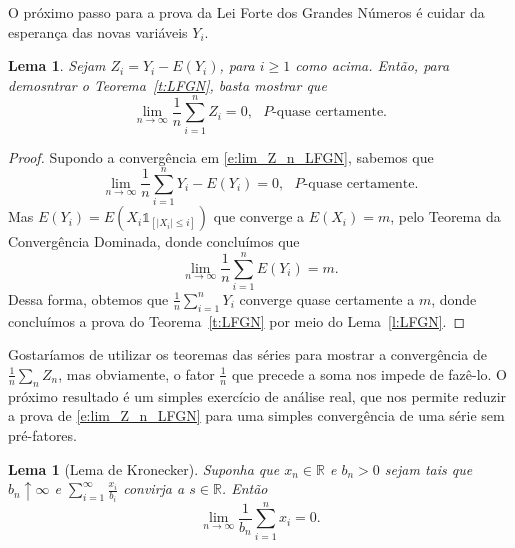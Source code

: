 \documentclass[reqno, draft]{book}
\newcommand*\1{\mathds{1}}
\newtheorem{lemma}[theorem]{Lema}
\begin{document}
O próximo passo para a prova da Lei Forte dos Grandes Números é cuidar da esperança das novas variáveis $Y_i$.
\begin{lemma}
  \label{l:lim_Z_n_LFGN}
  Sejam $Z_i = Y_i - E(Y_i)$, para $i \geq 1$ como acima.
  Então, para demosntrar o Teorema~\ref{t:LFGN}, basta mostrar que
  \begin{equation}
    \label{e:lim_Z_n_LFGN}
    \lim_{n \to \infty}\frac{1}{n} \sum_{i=1}^n Z_i = 0, \text{ $P$-quase certamente.}
  \end{equation}
\end{lemma}

\begin{proof}
  Supondo a convergência em \eqref{e:lim_Z_n_LFGN}, sabemos que
  \begin{equation}
    \lim_{n \to \infty} \frac{1}{n} \sum_{i=1}^n Y_i - E(Y_i) = 0, \text{ $P$-quase certamente.}
  \end{equation}
  Mas $E(Y_i) = E(X_i \1_{[|X_i| \leq i]})$ que converge a $E(X_i) = m$, pelo Teorema da Convergência Dominada, donde concluímos que
  \begin{equation}
    \lim_{n \to \infty} \frac{1}{n} \sum_{i=1}^n E(Y_i) = m.
  \end{equation}
  Dessa forma, obtemos que $\tfrac 1n \sum_{i=1}^n Y_i$ converge quase certamente a $m$, donde concluímos a prova do Teorema~\ref{t:LFGN} por meio do Lema~\ref{l:LFGN}.
\end{proof}

Gostaríamos de utilizar os teoremas das séries para mostrar a convergência de $\tfrac 1n \sum_{n} Z_n$, mas obviamente, o fator $\tfrac 1n$ que precede a soma nos impede de fazê-lo.
O próximo resultado é um simples exercício de análise real, que nos permite reduzir a prova de \eqref{e:lim_Z_n_LFGN} para uma simples convergência de uma série sem pré-fatores.

\begin{lemma}[Lema de Kronecker]
  Suponha que $x_n \in \mathbb{R}$ e $b_n > 0$ sejam tais que $b_n \uparrow \infty$ e $\sum_{i=1}^\infty \frac{x_i}{b_i}$ convirja a $s \in \mathbb{R}$.
  Então
  \begin{equation}
    \lim_{n \to \infty} \frac{1}{b_n} \sum_{i=1}^n x_i = 0.
  \end{equation}
\end{lemma}
\end{document}
